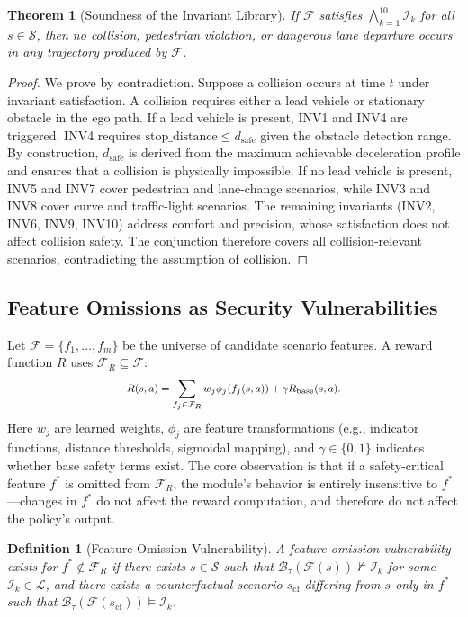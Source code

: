 \documentclass[journal]{IEEEtran}
\theoremstyle{plain}
\newtheorem{definition}{Definition}[section]
\newtheorem{theorem}{Theorem}[section]
\newcommand{\fwleq}[1]{\begin{equation}\medmath{#1}\end{equation}}
\newcommand{\invlib}{\mathcal{L}}
\newcommand{\sys}{\mathcal{F}}
\newcommand{\beh}{\mathcal{B}}
\begin{document}
\begin{theorem}[Soundness of the Invariant Library]\label{thm:soundness}
If $\sys$ satisfies $\bigwedge_{k=1}^{10} \mathcal{I}_k$ for all $s \in \mathcal{S}$, then no collision, pedestrian violation, or dangerous lane departure occurs in any trajectory produced by $\sys$.
\end{theorem}

\begin{proof}
We prove by contradiction. Suppose a collision occurs at time $t$ under invariant satisfaction. A collision requires either a lead vehicle or stationary obstacle in the ego path. If a lead vehicle is present, INV1 and INV4 are triggered. INV4 requires $\text{stop\_distance} \leq d_{\text{safe}}$ given the obstacle detection range. By construction, $d_{\text{safe}}$ is derived from the maximum achievable deceleration profile and ensures that a collision is physically impossible. If no lead vehicle is present, INV5 and INV7 cover pedestrian and lane-change scenarios, while INV3 and INV8 cover curve and traffic-light scenarios. The remaining invariants (INV2, INV6, INV9, INV10) address comfort and precision, whose satisfaction does not affect collision safety. The conjunction therefore covers all collision-relevant scenarios, contradicting the assumption of collision.
\end{proof}

\subsection{Feature Omissions as Security Vulnerabilities}

Let $\mathcal{F} = \{f_1,\dots,f_m\}$ be the universe of candidate scenario features. A reward function $R$ uses $\mathcal{F}_R \subseteq \mathcal{F}$:
\fwleq{R(s,a) = \sum_{f_j \in \mathcal{F}_R} w_j \phi_j(f_j(s,a)) + \gamma R_{\text{base}}(s,a).}
Here $w_j$ are learned weights, $\phi_j$ are feature transformations (e.g., indicator functions, distance thresholds, sigmoidal mapping), and $\gamma \in \{0,1\}$ indicates whether base safety terms exist. The core observation is that if a safety-critical feature $f^*$ is omitted from $\mathcal{F}_R$, the module's behavior is entirely insensitive to $f^*$---changes in $f^*$ do not affect the reward computation, and therefore do not affect the policy's output.

\begin{definition}[Feature Omission Vulnerability]\label{def:omission}
A feature omission vulnerability exists for $f^* \notin \mathcal{F}_R$ if there exists $s \in \mathcal{S}$ such that $\beh_{\tau}(\sys(s)) \not\models \mathcal{I}_k$ for some $\mathcal{I}_k \in \invlib$, and there exists a counterfactual scenario $s_{\text{cf}}$ differing from $s$ only in $f^*$ such that $\beh_{\tau}(\sys(s_{\text{cf}})) \models \mathcal{I}_k$.
\end{definition}
\end{document}
